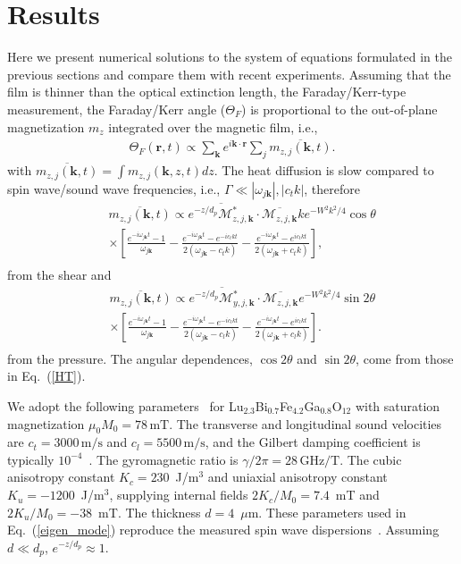 \documentclass[aps,prb,twocolumn,superscriptaddress,floatfix]{revtex4}%
\def\ber{\begin{eqnarray}}
\def\eer{\end{eqnarray}}
\begin{document}
\section{Results} 
Here we present numerical solutions to the system of equations formulated in the previous sections and compare them  with recent experiments. Assuming that the film is thinner than the optical extinction length, the Faraday/Kerr-type measurement, the Faraday/Kerr angle ($\Theta_{F}$) is proportional to the out-of-plane magnetization $m_{z}$ integrated over the magnetic film, i.e., 
\ber \Theta_{F}(\mathbf r,t) \propto \sum_{\mathbf k}e^{i\mathbf{k}\cdot\mathbf{r}}\sum_j\overline{ m_{z,j}(\mathbf{k},t)}.\label{eq:kerr}
\eer
with $\overline{ m_{z,j}(\mathbf{k},t)}=\int m_{z,j}(\mathbf{k},z,t) dz$. The heat diffusion is slow compared to spin wave/sound wave frequencies, i.e., $\Gamma\ll|\omega_{j\mathbf{k}}|,|c_{t}k|$, therefore
\ber
&&\overline{
 m_{z,j}(\mathbf{k},t)}\propto \overline{ e^{-z/d_p}\mathcal M^\ast_{z,j,\mathbf k}}\cdot \overline{ \mathcal M_{z,j,\mathbf k}} ke^{-W^{2}k^{2}/4} \cos\theta \nonumber\\
&&\times\left[\frac{e^{-i\omega_{j\mathbf{k}}t}-1}{\omega_{j\mathbf{k}}}-\frac{e^{-i\omega_{j\mathbf{k}}t}-e^{-ic_{t}kt}}{2(\omega_{j\mathbf{k}}-c_{t}k)}-\frac{e^{-i\omega_{j\mathbf{k}}t}-e^{ic_{t}kt}}{2(\omega_{j\mathbf{k}}+c_{t}k)}\right],\nonumber\\
\label{mzRkt}
\eer
from the shear and 
\ber
&&\overline{
 m_{z,j}(\mathbf{k},t)}\propto \overline{ e^{-z/d_p}\mathcal M^\ast_{y,j,\mathbf k}} \cdot\overline{ \mathcal M_{z,j,\mathbf k}}  e^{-W^{2}k^{2}/4} \sin 2\theta\nonumber\\
&&\times\left[\frac{e^{-i\omega_{j\mathbf{k}}t}-1}{\omega_{j\mathbf{k}}}-\frac{e^{-i\omega_{j\mathbf{k}}t}-e^{-ic_{l}kt}}{2(\omega_{j\mathbf{k}}-c_{l}k)}-\frac{e^{-i\omega_{j\mathbf{k}}t}-e^{ic_{l}kt}}{2(\omega_{j\mathbf{k}}+c_{l}k)}\right].\nonumber\\
\label{mzRkl}
\eer
from the pressure. The angular dependences, $\cos 2\theta$ and $\sin 2\theta$, come from those in Eq.~(\ref{HT}).

We adopt the following parameters~\cite{Hashimoto17} for Lu$_{2.3}$Bi$_{0.7}$Fe$_{4.2}$Ga$_{0.8}$O$_{12}$ with saturation magnetization $\mu_{0}M_{0}={78\,}\mathrm{mT}$. The transverse and longitudinal sound velocities are $c_{t}=3000\,\mathrm{m/s}$ and $c_{l}=5500\,\mathrm{m/s}$, and the Gilbert damping coefficient is typically $10^{-4}$~\cite{Manuilov09}. The gyromagnetic ratio is $\gamma/2\pi=28\,\mathrm{GHz/T}$. The cubic anisotropy constant $K_c =230$~J/m$^3$ and uniaxial anisotropy constant $K_u=-1200$~J/m$^3$, supplying internal fields $2K_c/M_0=7.4$~mT and $2K_u/M_0=-38$~mT. The thickness $d=4$~$\mu$m. These parameters used in Eq.~(\ref{eigen_mode}) reproduce the measured spin wave dispersions~\cite{Hashimoto17}. Assuming $d\ll d_p$, $e^{-z/d_p}\approx 1$.
\end{document}
